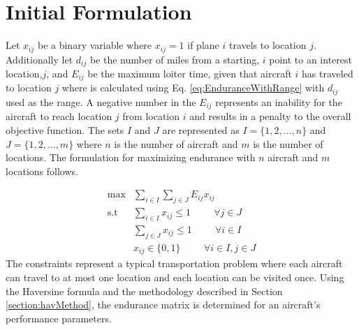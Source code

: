 \section{Initial Formulation}
Let $x_{ij}$ be a binary variable where $x_{ij} = 1$ if plane $i$ travels to location $j$. Additionally let $d_{ij}$ be the number of miles from a starting, $i$ point to an interest location,$j$, and $E_{ij}$ be the maximum loiter time, given that aircraft $i$ has traveled to location $j$ where is calculated using Eq. \ref{eq:EnduranceWithRange} with $d_{ij}$ used as the range. A negative number in the $E_{ij}$ represents an inability for the aircraft to reach location $j$ from location $i$ and results in a penalty to the overall objective function. The sets $I$ and $J$ are represented as $I = \{1,2,\dots,n\}$ and $J = \{1,2,\dots,m\}$ where $n$ is the number of aircraft and $m$ is the number of locations. The formulation for maximizing endurance with $n$ aircraft and $m$ locations follows.\par

\begin{align}
    \max &\sum_{i\in I}\sum_{j\in J} E_{ij}x_{ij}\hspace{1cm}\\
    \text{s.t } &\sum_{i\in I} x_{ij}\leq 1\hspace{1cm} \forall j\in J\\
    &\sum_{j\in J}x_{ij} \leq 1\hspace{1cm} \forall i \in I\\
    &x_{ij}\in \{0,1\} \hspace{1cm} \forall i\in I, j\in J
\end{align}
The constraints represent a typical transportation problem where each aircraft can travel to at most one location and each location can be visited once. Using the Haversine formula and the methodology described in Section \ref{section:havMethod}, the endurance matrix is determined for an aircraft's performance parameters. \par
